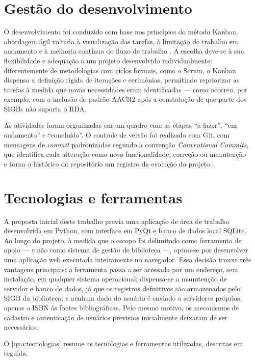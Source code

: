 \section{Gestão do desenvolvimento}
\label{sec:kanban}

O desenvolvimento foi conduzido com base nos princípios do método Kanban, abordagem ágil voltada à visualização das tarefas, à limitação do trabalho em andamento e à melhoria contínua do fluxo de trabalho \cite{anderson2010}. A escolha deve-se à sua flexibilidade e adequação a um projeto desenvolvido individualmente: diferentemente de metodologias com ciclos formais, como o Scrum, o Kanban dispensa a definição rígida de iterações e cerimônias, permitindo repriorizar as tarefas à medida que novas necessidades eram identificadas --- como ocorreu, por exemplo, com a inclusão do padrão AACR2 após a constatação de que parte dos SIGBs não suporta o RDA.

As atividades foram organizadas em um quadro com as etapas ``a fazer'', ``em andamento'' e ``concluído''. O controle de versão foi realizado com Git, com mensagens de \textit{commit} padronizadas segundo a convenção \textit{Conventional Commits}, que identifica cada alteração como nova funcionalidade, correção ou manutenção e torna o histórico do repositório um registro da evolução do projeto \cite{chacon2014}.

\section{Tecnologias e ferramentas}
\label{sec:tecnologias}

A proposta inicial deste trabalho previa uma aplicação de área de trabalho desenvolvida em Python, com interface em PyQt e banco de dados local SQLite. Ao longo do projeto, à medida que o escopo foi delimitado como ferramenta de apoio --- e não como sistema de gestão de biblioteca ---, optou-se por desenvolver uma aplicação web executada inteiramente no navegador. Essa decisão trouxe três vantagens principais: a ferramenta passa a ser acessada por um endereço, sem instalação, em qualquer sistema operacional; dispensa-se a manutenção de servidor e banco de dados, já que os registros definitivos são armazenados pelo SIGB da biblioteca; e nenhum dado do usuário é enviado a servidores próprios, apenas o ISBN às fontes bibliográficas. Pelo mesmo motivo, os mecanismos de cadastro e autenticação de usuários previstos inicialmente deixaram de ser necessários.

O \autoref{qua:tecnologias} resume as tecnologias e ferramentas utilizadas, descritas em seguida.

